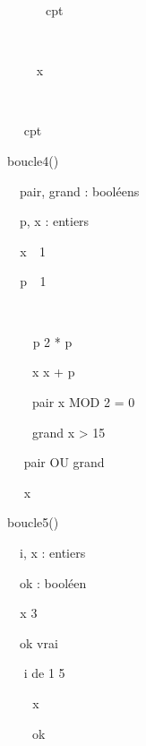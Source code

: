 {\sffamily
{\texttt{\ \ \ \ \ \ }}{cpt}{\texttt{
}}}

{\sffamily
\ \ \ \ }

{\sffamily
\ \ \ \  x}

{\sffamily
\ \ }

{\sffamily
\ \  cpt}

{\sffamily
{} }


\bigskip

{\sffamily
{} boucle4()}

{\sffamily
\ \ pair, grand : booléens}

{\sffamily
\ \ p, x : entiers}

{\sffamily
\texttt{\ \ }x\texttt{
}\texttt{ }1}

{\sffamily
\texttt{\ \ }p\texttt{
}\texttt{ }1}

{\sffamily
\ \ }

{\sffamily
\texttt{\ \ \ \ }p  2 * p}

{\sffamily
\ \ \ \ x  x + p}

{\sffamily
\ \ \ \ pair  x MOD 2 = 0}

{\sffamily
\ \ \ \ grand  x
{\textgreater} 15}

{\sffamily
\ \  pair OU grand}

{\sffamily
\ \  x}

{\sffamily
{} }


\bigskip

{\sffamily
{} boucle5()}

{\sffamily
\ \ i, x : entiers}

{\sffamily
\ \ ok : booléen}

{\sffamily
\texttt{\ \ }x  3}

{\sffamily
\ \ ok  vrai}

{\sffamily
\ \  i de 1  5
}

{\sffamily
{\texttt{\ \ }}{\ \ x
}}

{\sffamily
{\ \ \ \ ok
}}

